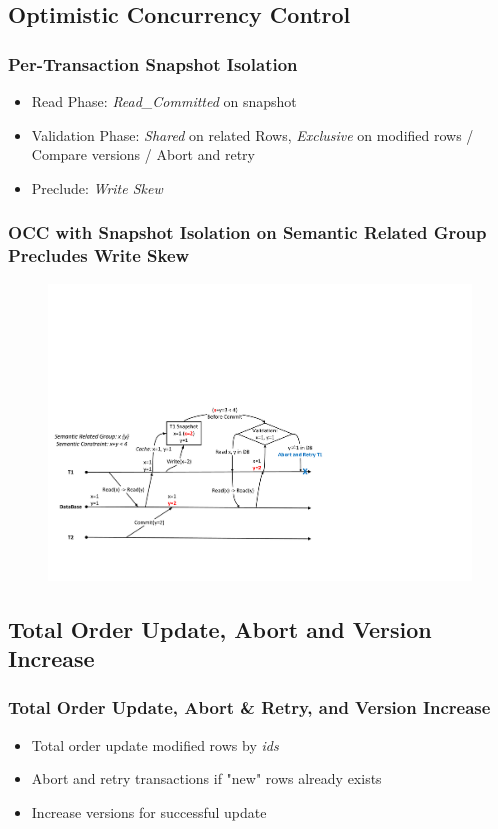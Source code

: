 \documentclass{beamer}
\begin{document}
\subsection{Optimistic Concurrency Control}
\begin{frame}
	\frametitle{Per-Transaction Snapshot Isolation}
	\begin{itemize}
		\item Read Phase: \textit{Read\_Committed} on snapshot
		\item Validation Phase: \textit{Shared} on related Rows, \textit{Exclusive} on modified rows / Compare versions / Abort and retry
		\item Preclude: \textit{Write Skew}
	\end{itemize}
\end{frame}
\begin{frame}
	\frametitle{OCC with Snapshot Isolation on Semantic Related Group Precludes Write Skew}
	\begin{figure}[h]
		\centering
		\includegraphics[width=\linewidth]{figs/snapwriteskew.pdf}
	\end{figure}
\end{frame}

\subsection{Total Order Update, Abort and Version Increase}
\begin{frame}
	\frametitle{Total Order Update, Abort \& Retry, and Version Increase}
	\begin{itemize}
		\item Total order update modified rows by \textit{ids}
		\item Abort and retry transactions if "new" rows already exists
		\item Increase versions for successful update
	\end{itemize}
\end{frame}
\end{document}
